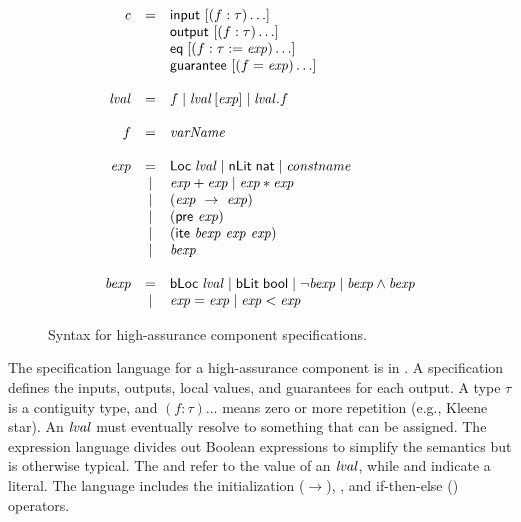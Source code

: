 \begin{figure}
  \[
    \begin{array}{rcl}
      \mathit{c}    & = & \konst{input}\ [(f : \tau)\ldots] \\
                    &   & \konst{output}\ [(f : \tau)\ldots] \\
                    &   & \konst{eq}\; [(f : \tau := \mathit{exp})\ldots] \\
                    &   & \konst{guarantee}\ [(f = \mathit{exp})\ldots]\\\\
      
      \lval         & = & f \mid \lval \, [ \mathit{exp} ]
                          \mid \lval . f \\ \\

      f             & = & \mathit{varName} \\ \\

      \mathit{exp}  & = & \konst{Loc}\; \lval
                          \mid \konst{nLit}\; \konst{nat}
                          \mid \mathit{constname} \\
                    & | & \mathit{exp} + \mathit{exp}
                          \mid \mathit{exp} * \mathit{exp} \\
                    & | & (\mathit{exp}\ \rightarrow\ \mathit{exp}) \\
                    & | & (\konst{pre}\ \mathit{exp}) \\
                    & | & (\konst{ite}\ \mathit{bexp}\ \mathit{exp}\ \mathit{exp})\\
                    & | & \mathit{bexp} \\ \\
                          
      \mathit{bexp} & = & \konst{bLoc}\; \lval
                          \mid  \konst{bLit}\; \konst{bool}
                          \mid  \neg \mathit{bexp}
                          \mid  \mathit{bexp} \land \mathit{bexp} \\
                    & | & \mathit{exp} = \mathit{exp} 
                    \mid  \mathit{exp} < \mathit{exp}
\end{array}
\]
\caption{Syntax for high-assurance component specifications.}
\label{fig:syntax}
\end{figure}

The specification language for a high-assurance component is in . 
A specification defines the inputs, outputs, local values, and guarantees for each output. 
A type $\tau$ is a contiguity type, and $(f : \tau)\ldots$ means zero or more repetition (e.g., Kleene star). 
An $\mathit{lval}$ must eventually resolve to something that can be assigned. 
The expression language divides out Boolean expressions to simplify the semantics but is otherwise typical. 
The  and  refer to the value of an $\mathit{lval}$, while  and  indicate a literal. 
The language includes the initialization ($\rightarrow$), , and if-then-else () operators.

